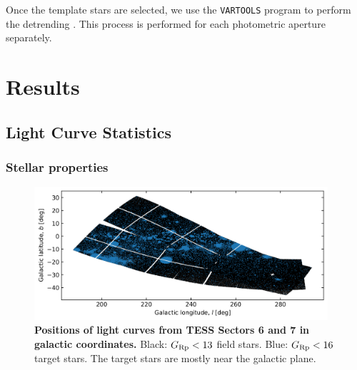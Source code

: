 \documentclass[12pt,twocolumn,tighten]{aastex62}
\begin{document}
Once the template stars are selected, we use the \texttt{VARTOOLS}
program to perform the detrending \citep{Hartman_Bakos_2016}.
This process is performed for each photometric aperture
separately.


\section{Results}
\label{sec:results}



\subsection{Light Curve Statistics}
\label{subsec:lcstatistics}

\subsubsection{Stellar properties}

\begin{figure}[!t]
	\begin{center}
		\leavevmode
		\includegraphics[width=0.97\textwidth]{galacticcoords_cluster_field_star_positions.png}
	\end{center}
	\vspace{-0.5cm}
	\caption{
		{\bf Positions of light curves from TESS Sectors 6
			and 7 in galactic coordinates.}
        Black: $G_{\rm Rp}<13$ field stars.  Blue: $G_{\rm Rp}<16$
        target stars.  The target stars are mostly near the galactic
        plane.
		\label{fig:lcgalactic}
	}
\end{figure}
\end{document}
